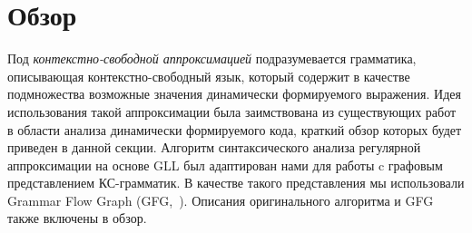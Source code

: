 \section{Обзор}



Под \textit{контекстно-свободной аппроксимацией} подразумевается грамматика, описывающая контекстно-свободный язык, который содержит в качестве подмножества возможные значения динамически формируемого выражения. Идея использования такой аппроксимации была заимствована из существующих работ в области анализа динамически формируемого кода, краткий обзор которых будет приведен в данной секции. Алгоритм синтаксического анализа регулярной аппроксимации на основе GLL был адаптирован нами для работы c графовым представлением КС-грамматик. В качестве такого представления мы использовали Grammar Flow Graph (GFG,~\cite{gfg}). Описания оригинального алгоритма и GFG также включены в обзор. 


